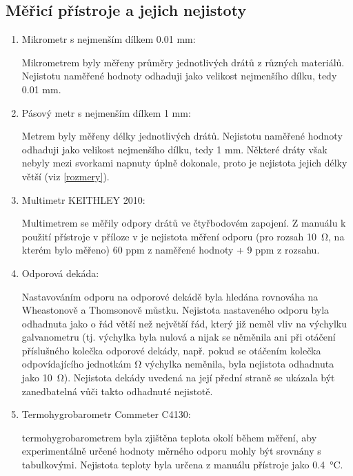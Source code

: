 \documentclass{../concepts/prepareprotokol} %
\begin{document}
\subsection{Měřicí přístroje a jejich nejistoty} \label{pomucky}
\begin{enumerate}
    \item Mikrometr s nejmenším dílkem 0.01 mm:
    
    Mikrometrem byly měřeny průměry jednotlivých drátů z různých materiálů. Nejistotu naměřené hodnoty odhaduji jako velikost nejmenšího dílku, tedy 0.01 mm.

    \item Pásový metr s nejmenším dílkem 1 mm:

    Metrem byly měřeny délky jednotlivých drátů. Nejistotu naměřené hodnoty odhaduji jako velikost nejmenšího dílku, tedy 1 mm. Některé dráty však nebyly mezi svorkami napnuty úplně dokonale, proto je nejistota jejich délky větší (viz \ref{rozmery}).

    \item Multimetr KEITHLEY 2010:

    Multimetrem se měřily odpory drátů ve čtyřbodovém zapojení. Z manuálu k použití přístroje v příloze v \cite{pokyny} je nejistota měření odporu (pro rozsah \SI{10}{\ohm}, na kterém bylo měřeno) 60 ppm z naměřené hodnoty + 9 ppm z rozsahu.

    \item Odporová dekáda:

    Nastavováním odporu na odporové dekádě byla hledána rovnováha na Wheastonově a Thomsonově můstku. Nejistota 
    nastaveného odporu byla odhadnuta jako o řád větší než největší řád, který již neměl vliv na výchylku galvanometru 
    (tj. výchylka byla nulová a nijak se něměnila ani při otáčení příslušného kolečka odporové dekády, např. pokud se otáčením
    kolečka odpovídajícího jednotkám \si{\ohm} výchylka neměnila, byla nejistota odhadnuta jako \SI{10}{\ohm}). Nejistota
    dekády uvedená na její přední straně se ukázala být zanedbatelná vůči takto odhadnuté nejistotě.

    \item Termohygrobarometr Commeter C4130:

    termohygrobarometrem byla zjištěna teplota okolí během měření, aby experimentálně určené hodnoty měrného odporu mohly být srovnány s tabulkovými. Nejistota teploty byla určena z manuálu přístroje jako \SI{0.4}{\celsius}.

\end{enumerate}
\end{document}
